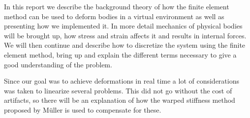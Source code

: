 In this report we describe the background theory of how the finite element method can be used to deform bodies in a virtual environment as well as presenting how we implemented it. In more detail mechanics of physical bodies will be brought up, how stress and strain affects it and results in internal forces. We will then continue and describe how to discretize the system using the finite element method, bring up and explain the different terms necessary to give a good understanding of the problem. 

Since our goal was to achieve deformations in real time a lot of considerations was taken to linearize several problems. This did not go without the cost of artifacts, so there will be an explanation of how the warped stiffness method proposed by M\"uller is used to compensate for these.